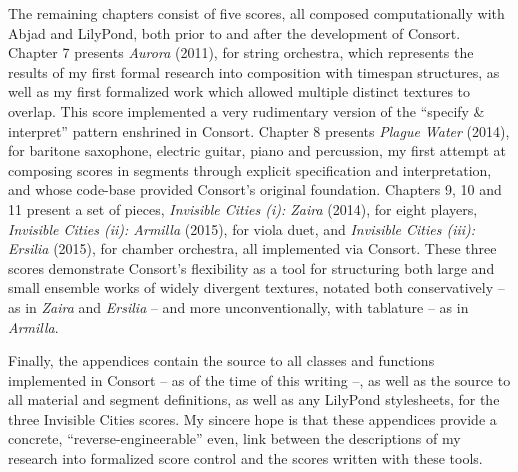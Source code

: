 The remaining chapters consist of five scores, all composed computationally
with Abjad and LilyPond, both prior to and after the development of Consort.
Chapter 7 presents \emph{Aurora} (2011), for string orchestra, which represents
the results of my first formal research into composition with timespan
structures, as well as my first formalized work which allowed multiple distinct
textures to overlap. This score implemented a very rudimentary version of the
\enquote{specify \& interpret} pattern enshrined in Consort. Chapter 8 presents
\emph{Plague Water} (2014), for baritone saxophone, electric guitar, piano and
percussion, my first attempt at composing scores in segments through explicit
specification and interpretation, and whose code-base provided Consort's
original foundation. Chapters 9, 10 and 11 present a set of pieces,
\emph{Invisible Cities (i): Zaira} (2014), for eight players, \emph{Invisible
Cities (ii): Armilla} (2015), for viola duet, and \emph{Invisible Cities (iii):
Ersilia} (2015), for chamber orchestra, all implemented via Consort. These
three scores demonstrate Consort's flexibility as a tool for structuring both
large and small ensemble works of widely divergent textures, notated both
conservatively -- as in \emph{Zaira} and \emph{Ersilia} -- and more
unconventionally, with tablature -- as in \emph{Armilla}.

Finally, the appendices contain the source to all classes and functions
implemented in Consort -- as of the time of this writing --, as well as the
source to all material and segment definitions, as well as any LilyPond
stylesheets, for the three Invisible Cities scores. My sincere hope is that
these appendices provide a concrete, \enquote{reverse-engineerable} even, link
between the descriptions of my research into formalized score control and the
scores written with these tools.